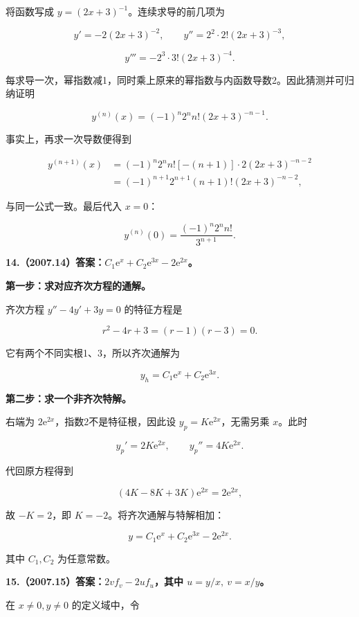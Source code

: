 \documentclass[UTF8,11pt,fontset=windows]{ctexart}
\begin{document}
将函数写成 $y=(2x+3)^{-1}$。连续求导的前几项为

$$
y'=-2(2x+3)^{-2},
\qquad
y''=2^2\cdot2!(2x+3)^{-3},
$$

$$
y'''=-2^3\cdot3!(2x+3)^{-4}.
$$

每求导一次，幂指数减1，同时乘上原来的幂指数与内函数导数2。因此猜测并可归纳证明

$$
y^{(n)}(x)=(-1)^n2^n n!(2x+3)^{-n-1}.
$$

事实上，再求一次导数便得到

$$
\begin{aligned}
y^{(n+1)}(x)
&=(-1)^n2^n n![-(n+1)]\cdot2(2x+3)^{-n-2}\\
&=(-1)^{n+1}2^{n+1}(n+1)!(2x+3)^{-n-2},
\end{aligned}
$$

与同一公式一致。最后代入 $x=0$：

$$
\boxed{y^{(n)}(0)=\frac{(-1)^n2^n n!}{3^{n+1}}.}
$$

\clearpage

\textbf{14.（2007.14）答案：$C_1\mathrm e^x+C_2\mathrm e^{3x}-2\mathrm e^{2x}$。}

\textbf{第一步：求对应齐次方程的通解。}

齐次方程 $y''-4y'+3y=0$ 的特征方程是

$$
r^2-4r+3=(r-1)(r-3)=0.
$$

它有两个不同实根1、3，所以齐次通解为

$$
y_h=C_1\mathrm e^x+C_2\mathrm e^{3x}.
$$

\textbf{第二步：求一个非齐次特解。}

右端为 $2\mathrm e^{2x}$，指数2不是特征根，因此设 $y_p=K\mathrm e^{2x}$，无需另乘 $x$。此时

$$
y_p'=2K\mathrm e^{2x},\qquad y_p''=4K\mathrm e^{2x}.
$$

代回原方程得到

$$
(4K-8K+3K)\mathrm e^{2x}=2\mathrm e^{2x},
$$

故 $-K=2$，即 $K=-2$。将齐次通解与特解相加：

$$
\boxed{y=C_1\mathrm e^x+C_2\mathrm e^{3x}-2\mathrm e^{2x}.}
$$

其中 $C_1,C_2$ 为任意常数。

\clearpage

\textbf{15.（2007.15）答案：$2v f_v-2u f_u$，其中 $u=y/x,\ v=x/y$。}

在 $x\ne0,y\ne0$ 的定义域中，令
\end{document}
